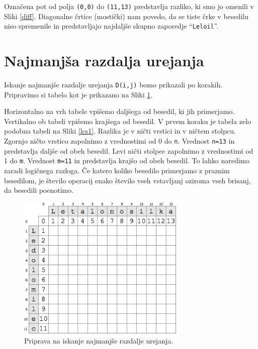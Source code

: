 \documentclass[a4paper, 12pt, twoside]{book}
\begin{document}
Označena pot od polja {\tt (0,0)} do {\tt (11,13)} predstavlja razliko, ki smo jo omenili v Sliki \ref{diff}. Diagonalne črtice (mostički) nam povedo, da se tiste črke v besedilu niso spremenile in predstavljajo najdaljše skupno zaporedje “{\tt Leloil}”.

\section{Najmanjša razdalja urejanja}
\label{sec:med}

Iskanje najmanjše razdalje urejanja {\tt D(i,j)} bomo prikazali po korakih. Pripravimo si tabelo kot je prikazano na Sliki \ref{med1}.

Horizontalno na vrh tabele vpišemo daljšega od besedil, ki jih primerjamo. Vertikalno ob tabeli vpišemo krajšega od besedil. V prvem koraku je tabela zelo podobna tabeli na Sliki \ref{lcs1}. Razlika je v ničti vrstici in v ničtem stolpcu. Zgornjo ničto vrstico zapolnimo z vrednostimi od 0 do {\tt n}. Vrednost {\tt n=13} in predstavlja daljše od obeh besedil. Levi ničti stolpec zapolnimo z vrednostimi od 1 do {\tt m}. Vrednost {\tt m=11} in predstavlja krajšo od obeh besedil. To lahko naredimo zaradi logičnega razloga. Če katero koliko besedilo primerjamo z praznim besedilom, je število operacij enako število vseh vstavljanj oziroma vseh brisanj, da besedili poenotimo.

\begin{figure}[placement h]
\begin{center}
\includegraphics[width=8cm]{med1.png}
\end{center}
\caption{Priprava na iskanje najmanjše razdalje urejanja.}
\label{med1}
\end{figure}
\end{document}
